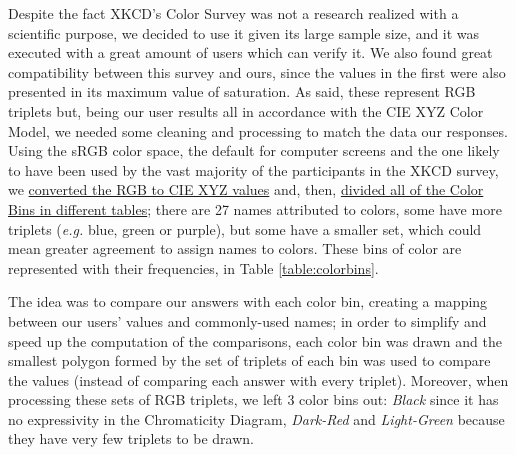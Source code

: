 %
Despite the fact XKCD's Color Survey was not a research realized with a scientific purpose, we decided to use it given its large sample size, and it was executed with a great amount of users
which can verify it. We also found great compatibility between this survey and ours, since the values in the first were also presented in its maximum value of saturation.
%
As said, these represent \gls{RGB} triplets but, being our user results all in accordance with the CIE XYZ Color Model, we needed some cleaning and processing to match the data our
responses. Using the sRGB color space, the default for computer screens and the one likely to have been used by the vast majority of the participants in the XKCD survey, we
\ul{converted the RGB to CIE XYZ values} and, then, \ul{divided all of the Color Bins in different tables}; there are 27 names attributed to colors, some have more triplets
(\emph{e.g.} blue, green or purple), but some have a smaller set, which could mean greater agreement to assign names to colors. These bins of color are represented with their frequencies, in Table
\ref{table:colorbins}. \par
%
The idea was to compare our answers with each color bin, creating a mapping between our users' values and commonly-used names; in order to simplify and speed up the computation
of the comparisons, each color bin was drawn and the smallest polygon formed by the set of triplets of each bin was used to compare the values (instead of comparing each answer
with every triplet). Moreover, when processing these sets of RGB triplets, we left 3 color bins out: \emph{Black} since it has no expressivity in the Chromaticity Diagram,
\emph{Dark-Red} and \emph{Light-Green} because they have very few triplets to be drawn.
%
